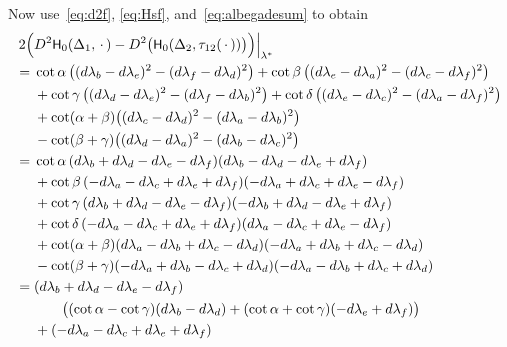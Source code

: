 \documentclass[a4paper, 11pt]{article}
\newcommand{\Hsf}{\scalebox{0.94}{$\mathsf{H}$}}
\theoremstyle{plain}
\theoremstyle{definition}
\begin{document}
Now use~\eqref{eq:d2f}, \eqref{eq:Hsf}, and~\eqref{eq:albegadesum} to
obtain \begingroup \allowdisplaybreaks
\begin{align*}
  2\Big(
  & D^{2}\Hsf_{0}(\Delta_{1},\,\cdot\,)
    -D^{2}\big(\Hsf_{0}(\Delta_{2},\tau_{12}(\,\cdot\,))
    \big)\Big)\Big|_{\lambda^{*}}\\
  =\;
  &
    \cot\alpha\,\big((d\lambda_{b}-d\lambda_{e})^{2}-(d\lambda_{f}-d\lambda_{d})^{2}\big)
    +
    \cot\beta\,\big((d\lambda_{e}-d\lambda_{a})^{2}-(d\lambda_{c}-d\lambda_{f})^{2}\big)\\
  & +
    \cot\gamma\,\big((d\lambda_{d}-d\lambda_{e})^{2}-(d\lambda_{f}-d\lambda_{b})^{2}\big)
    +
    \cot\delta\,\big((d\lambda_{e}-d\lambda_{c})^{2}-(d\lambda_{a}-d\lambda_{f})^{2}\big)\\
  & +
    \cot(\alpha+\beta)\big((d\lambda_{c}-d\lambda_{d})^{2}-(d\lambda_{a}-d\lambda_{b})^{2}\big)\\
  & -
    \cot(\beta+\gamma)\big((d\lambda_{d}-d\lambda_{a})^{2}-(d\lambda_{b}-d\lambda_{c})^{2}\big)\\
  =\;
  & \cot\alpha\,
    (d\lambda_{b}+d\lambda_{d}-d\lambda_{e}-d\lambda_{f})
    (d\lambda_{b}-d\lambda_{d}-d\lambda_{e}+d\lambda_{f})\\
  & +
    \cot\beta\,
    (-d\lambda_{a}-d\lambda_{c}+d\lambda_{e}+d\lambda_{f})
    (-d\lambda_{a}+d\lambda_{c}+d\lambda_{e}-d\lambda_{f})\\  
  & +
    \cot\gamma\,
    (d\lambda_{b}+d\lambda_{d}-d\lambda_{e}-d\lambda_{f})
    (-d\lambda_{b}+d\lambda_{d}-d\lambda_{e}+d\lambda_{f})\\  
  & +
    \cot\delta\,
    (-d\lambda_{a}-d\lambda_{c}+d\lambda_{e}+d\lambda_{f})
    (d\lambda_{a}-d\lambda_{c}+d\lambda_{e}-d\lambda_{f})\\  
  & +
    \cot(\alpha+\beta)
    (d\lambda_{a}-d\lambda_{b}+d\lambda_{c}-d\lambda_{d})
    (-d\lambda_{a}+d\lambda_{b}+d\lambda_{c}-d\lambda_{d})\\  
  & -
    \cot(\beta+\gamma)
    (-d\lambda_{a}+d\lambda_{b}-d\lambda_{c}+d\lambda_{d})
    (-d\lambda_{a}-d\lambda_{b}+d\lambda_{c}+d\lambda_{d})\\
  =\;
  &
    (d\lambda_{b}+d\lambda_{d}-d\lambda_{e}-d\lambda_{f})\\
  & \qquad
    \big(
    (\cot\alpha-\cot\gamma)(d\lambda_{b}-d\lambda_{d})
    +
    (\cot\alpha+\cot\gamma)(-d\lambda_{e}+d\lambda_{f})
    \big)\\
  & +
    (-d\lambda_{a}-d\lambda_{c}+d\lambda_{e}+d\lambda_{f})\\

\end{align*}
\end{document}
